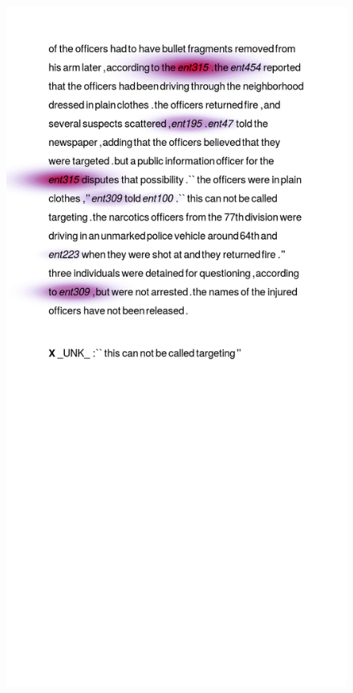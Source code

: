 \begin{figure}[t]
  \centering
  \includegraphics[scale=0.30,clip=true,trim=3cm 27cm 2.2cm 2cm]{figs/goodexamples/130b.png}%

\end{figure}
